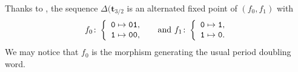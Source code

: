\documentclass[12pt,reqno]{article}
\begin{document}
Thanks to \cite[Prop.~16]{RigSti1}, the sequence $\Delta(\mathbf{t}_{3/2}$ is an alternated fixed point of $(f_0,f_1)$ with 
\begin{equation}
  \label{eq:mortoy}
  f_0 \colon \left\{\begin{array}{l}
                      {\tt 0} \mapsto{\tt  01},\\
                      {\tt 1}\mapsto{\tt  00},\\
                    \end{array}\right.\quad \text{ and }
  f_1\colon \left\{\begin{array}{l}
                      {\tt 0} \mapsto{\tt  1},\\
                      {\tt 1}\mapsto{\tt  0}.\\
                    \end{array}\right.
                \end{equation}
We may notice that $f_0$ is the morphism generating the usual period doubling word.
\end{document}
